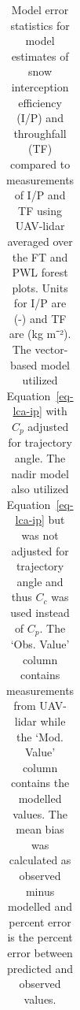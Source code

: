 \documentclass[
  letterpaper,
  DIV=11,
  numbers=noendperiod]{scrartcl}
\begin{document}
\begin{longtable}[]{@{}
  >{\raggedright\arraybackslash}p{}
  >{\raggedright\arraybackslash}p{}
  >{\raggedright\arraybackslash}p{}
  >{\raggedright\arraybackslash}p{}
  >{\raggedleft\arraybackslash}p{}
  >{\raggedleft\arraybackslash}p{}
  >{\raggedleft\arraybackslash}p{}
  >{\raggedleft\arraybackslash}p{}@{}}

\caption{\label{tbl-vb-plot-err}Model error statistics for model
estimates of snow interception efficiency (I/P) and throughfall (TF)
compared to measurements of I/P and TF using UAV-lidar averaged over the
FT and PWL forest plots. Units for I/P are (-) and TF are (kg m⁻²). The
vector-based model utilized Equation~\ref{eq-lca-ip} with \(C_p\)
adjusted for trajectory angle. The nadir model also utilized
Equation~\ref{eq-lca-ip} but was not adjusted for trajectory angle and
thus \(C_c\) was used instead of \(C_p\). The `Obs. Value' column
contains measurements from UAV-lidar while the `Mod. Value' column
contains the modelled values. The mean bias was calculated as observed
minus modelled and percent error is the percent error between predicted
and observed values.}

\tabularnewline


\end{longtable}
\end{document}
